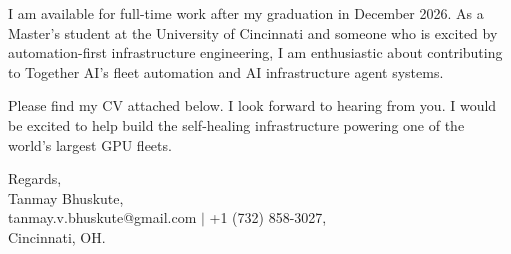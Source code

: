 \documentclass[11pt]{letter}
\begin{document}
\begin{letter}{}
I am available for full-time work after my graduation in December 2026. As a Master's student at the University of Cincinnati and someone who is excited by automation-first infrastructure engineering, I am enthusiastic about contributing to Together AI's fleet automation and AI infrastructure agent systems.

Please find my CV attached below. I look forward to hearing from you. I would be excited to help build the self-healing infrastructure powering one of the world's largest GPU fleets.

{\setlength{\parskip}{0pt}
Regards,\\
Tanmay Bhuskute,\\
tanmay.v.bhuskute@gmail.com $\mid$ +1 (732) 858-3027,\\
Cincinnati, OH.
}

\end{letter}
\end{document}
